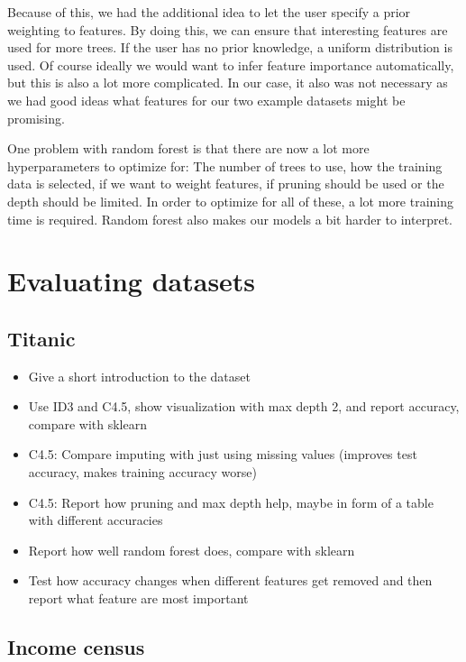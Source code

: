 \documentclass[a4paper]{article}
\begin{document}
Because of this, we had the additional idea to let the user specify a prior weighting to features. By doing this, we can ensure that interesting features are used for more trees. If the user has no prior knowledge, a uniform distribution is used. Of course ideally we would want to infer feature importance automatically, but this is also a lot more complicated. In our case, it also was not necessary as we had good ideas what features for our two example datasets might be promising.

One problem with random forest is that there are now a lot more hyperparameters to optimize for: The number of trees to use, how the training data is selected, if we want to weight features, if pruning should be used or the depth should be limited. In order to optimize for all of these, a lot more training time is required. Random forest also makes our models a bit harder to interpret.

\section{Evaluating datasets}

\subsection{Titanic}

\begin{itemize}
	\item Give a short introduction to the dataset
    \item Use ID3 and C4.5, show visualization with max depth 2, and report accuracy, compare with sklearn
    \item C4.5: Compare imputing with just using missing values (improves test accuracy, makes training accuracy worse)
    \item C4.5: Report how pruning and max depth help, maybe in form of a table with different accuracies
    \item Report how well random forest does, compare with sklearn
    \item Test how accuracy changes when different features get removed and then report what feature are most important
\end{itemize}

\subsection{Income census}
\end{document}
